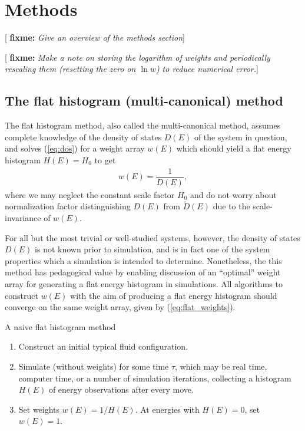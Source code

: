 \documentclass[11pt]{article}
\newcommand{\f}[2]{\dfrac{#1}{#2}} %
\newcommand{\p}[1]{\left(#1\right)} %
\newenvironment{alg}
{\hrulefill\begin{enumerate}}
{\end{enumerate}\hrulefill}
\newcommand{\red}[1]{{\bf \color{red} #1}}
\newcommand{\fixme}[1]{[\red{fixme:} \emph{#1}]}
\begin{document}
\section{Methods}
\label{sec:methods}

\fixme{Give an overview of the methods section}

\fixme{Make a note on storing the logarithm of weights and
  periodically rescaling them (resetting the zero on $\ln w$) to
  reduce numerical error.}

\subsection{The flat histogram (multi-canonical) method}
\label{sec:flat_histogram}

The flat histogram method, also called the multi-canonical method,
assumes complete knowledge of the density of states $D\p{E}$ of the
system in question, and solves (\ref{eq:dos}) for a weight array
$w\p{E}$ which should yield a flat energy histogram $H\p E=H_0$ to get
\begin{align}
  w\p E=\f1{D\p E},
  \label{eq:flat_weights}
\end{align}
where we may neglect the constant scale factor $H_0$ and do not worry
about normalization factor distinguishing $D\p{E}$ from $\tilde
D\p{E}$ due to the scale-invariance of $w\p{E}$.

For all but the most trivial or well-studied systems, however, the
density of states $D\p{E}$ is not known prior to simulation, and is in
fact one of the system properties which a simulation is intended to
determine. Nonetheless, the this method has pedagogical value by
enabling discussion of an ``optimal'' weight array for generating a
flat energy histogram in simulations. All algorithms to construct
$w\p{E}$ with the aim of producing a flat energy histogram should
converge on the same weight array, given by (\ref{eq:flat_weights}).

\begin{algorithm}[b]
  \caption{A naive flat histogram method}
  \label{alg:flat_histogram}
  \begin{alg}

  \item Construct an initial typical fluid configuration.

  \item Simulate (without weights) for some time $\tau$, which may be
    real time, computer time, or a number of simulation iterations,
    collecting a histogram $H\p{E}$ of energy observations after every
    move.

  \item Set weights $w\p{E}=1/H\p{E}$. At energies with $H\p{E}=0$,
    set $w\p{E}=1$.

  \end{alg}
\end{algorithm}
\end{document}
